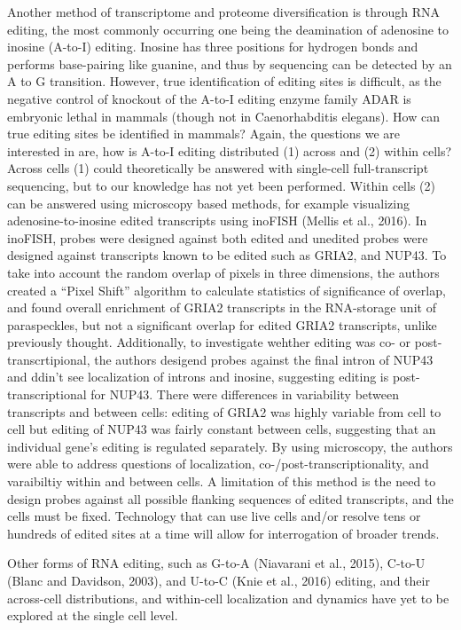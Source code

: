 Another method of transcriptome and proteome diversification is through RNA editing, the most commonly occurring one being the deamination of adenosine to inosine (A-to-I) editing. Inosine has three positions for hydrogen bonds and performs base-pairing like guanine, and thus by sequencing can be detected by an A to G transition. However, true identification of editing sites is difficult, as the negative control of knockout of the A-to-I editing enzyme family ADAR is embryonic lethal in mammals (though not in Caenorhabditis elegans). How can true editing sites be identified in mammals? Again, the questions we are interested in are, how is A-to-I editing distributed (1) across and (2) within cells? Across cells (1) could theoretically be answered with single-cell full-transcript sequencing, but to our knowledge has not yet been performed. Within cells (2) can be answered using microscopy based methods, for example visualizing adenosine-to-inosine edited transcripts using inoFISH (Mellis et al., 2016). In inoFISH, probes were designed against both edited and unedited probes were designed against transcripts known to be edited such as GRIA2, and NUP43. To take into account the random overlap of pixels in three dimensions, the authors created a “Pixel Shift” algorithm to calculate statistics of significance of overlap, and found overall enrichment of GRIA2 transcripts in the RNA-storage unit of paraspeckles, but not a significant overlap for edited GRIA2 transcripts, unlike previously thought. Additionally, to investigate wehther editing was co- or post-transcrtipional, the authors desigend probes against the final intron of NUP43 and ddin’t see localization of introns and inosine, suggesting editing is post-transcriptional for NUP43. There were differences in variability between transcripts and between cells: editing of GRIA2 was highly variable from cell to cell but editing of NUP43 was fairly constant between cells, suggesting that an individual gene’s editing is regulated separately. By using microscopy, the authors were able to address questions of localization, co-/post-transcriptionality, and varaibiltiy within and between cells. A limitation of this method is the need to design probes against all possible flanking sequences of edited transcripts, and the cells must be fixed. Technology that can use live cells and/or resolve tens or hundreds of edited sites at a time will allow for interrogation of broader trends.

Other forms of RNA editing, such as G-to-A (Niavarani et al., 2015), C-to-U (Blanc and Davidson, 2003), and U-to-C (Knie et al., 2016) editing, and their across-cell distributions, and within-cell localization and dynamics have yet to be explored at the single cell level.

